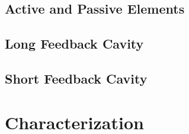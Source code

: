\subsection{Active and Passive Elements}

\subsection{Long Feedback Cavity}

\subsection{Short Feedback Cavity}

\section{Characterization}

